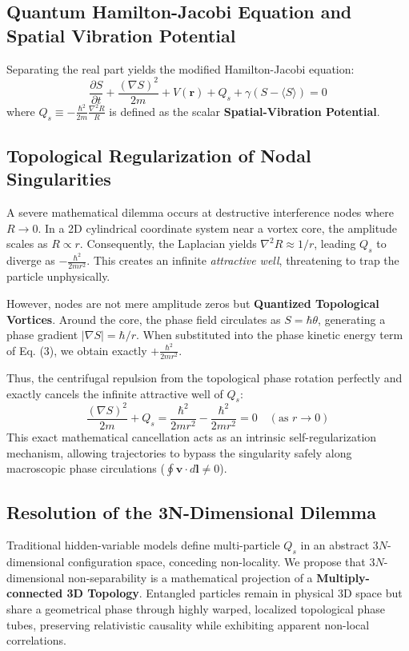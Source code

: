 \documentclass[reprint,amsmath,amssymb,aps,prd]{revtex4-2}
\begin{document}
\subsection{Quantum Hamilton-Jacobi Equation and Spatial Vibration Potential}
Separating the real part yields the modified Hamilton-Jacobi equation:
\begin{equation}
\frac{\partial S}{\partial t} + \frac{(\nabla S)^2}{2m} + V(\mathbf{r}) + Q_s + \gamma(S - \langle S \rangle) = 0
\end{equation}
where $Q_s \equiv -\frac{\hbar^2}{2m} \frac{\nabla^2 R}{R}$ is defined as the scalar \textbf{Spatial-Vibration Potential}.

\subsection{Topological Regularization of Nodal Singularities}
A severe mathematical dilemma occurs at destructive interference nodes where $R \to 0$. In a 2D cylindrical coordinate system near a vortex core, the amplitude scales as $R \propto r$. Consequently, the Laplacian yields $\nabla^2 R \approx 1/r$, leading $Q_s$ to diverge as $-\frac{\hbar^2}{2m r^2}$. This creates an infinite \textit{attractive well}, threatening to trap the particle unphysically.

However, nodes are not mere amplitude zeros but \textbf{Quantized Topological Vortices}. Around the core, the phase field circulates as $S = \hbar \theta$, generating a phase gradient $|\nabla S| = \hbar/r$. When substituted into the phase kinetic energy term of Eq. (3), we obtain exactly $+\frac{\hbar^2}{2m r^2}$. 

Thus, the centrifugal repulsion from the topological phase rotation perfectly and exactly cancels the infinite attractive well of $Q_s$:
\begin{equation}
\frac{(\nabla S)^2}{2m} + Q_s = \frac{\hbar^2}{2m r^2} - \frac{\hbar^2}{2m r^2} = 0 \quad (\text{as } r \to 0)
\end{equation}
This exact mathematical cancellation acts as an intrinsic self-regularization mechanism, allowing trajectories to bypass the singularity safely along macroscopic phase circulations ($\oint \mathbf{v} \cdot d\mathbf{l} \neq 0$).

\subsection{Resolution of the 3N-Dimensional Dilemma}
Traditional hidden-variable models define multi-particle $Q_s$ in an abstract $3N$-dimensional configuration space, conceding non-locality. We propose that $3N$-dimensional non-separability is a mathematical projection of a \textbf{Multiply-connected 3D Topology}. Entangled particles remain in physical 3D space but share a geometrical phase through highly warped, localized topological phase tubes, preserving relativistic causality while exhibiting apparent non-local correlations.
\end{document}
